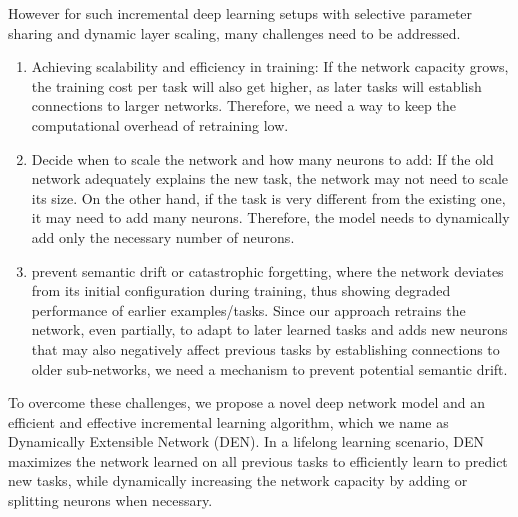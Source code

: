 However for such incremental deep learning setups with selective parameter sharing and dynamic layer scaling, many challenges need to be addressed.
\begin{enumerate}[\qquad  1.]
	\item Achieving scalability and efficiency in training: If the network capacity grows, the training cost per task will also get higher, as later tasks will establish connections to larger networks. Therefore, we need a way to keep the computational overhead of retraining low.
	\item Decide when to scale the network and how many neurons to add: If the old network adequately explains the new task, the network may not need to scale its size. On the other hand, if the task is very different from the existing one, it may need to add many neurons. Therefore, the model needs to dynamically add only the necessary number of neurons.
	\item prevent semantic drift or catastrophic forgetting, where the network deviates from its initial configuration during training, thus showing degraded performance of earlier examples/tasks. Since our approach retrains the network, even partially, to adapt to later learned tasks and adds new neurons that may also negatively affect previous tasks by establishing connections to older sub-networks, we need a mechanism to prevent potential semantic drift.
\end{enumerate}

To overcome these challenges, we propose a novel deep network model and an efficient and effective incremental learning algorithm, which we name as Dynamically Extensible Network (DEN). In a lifelong learning scenario, DEN maximizes the network learned on all previous tasks to efficiently learn to predict new tasks, while dynamically increasing the network capacity by adding or splitting neurons when necessary.

